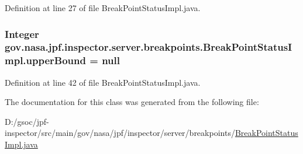 Definition at line 27 of file Break\+Point\+Status\+Impl.\+java.

\subsubsection[{\texorpdfstring{upper\+Bound}{upperBound}}]{\setlength{\rightskip}{0pt plus 5cm}Integer gov.\+nasa.\+jpf.\+inspector.\+server.\+breakpoints.\+Break\+Point\+Status\+Impl.\+upper\+Bound = null\hspace{0.3cm}{\ttfamily [private]}}\hypertarget{classgov_1_1nasa_1_1jpf_1_1inspector_1_1server_1_1breakpoints_1_1_break_point_status_impl_af41be5d132bc3dfc4e315cceadb116ea}{}\label{classgov_1_1nasa_1_1jpf_1_1inspector_1_1server_1_1breakpoints_1_1_break_point_status_impl_af41be5d132bc3dfc4e315cceadb116ea}


Definition at line 42 of file Break\+Point\+Status\+Impl.\+java.



The documentation for this class was generated from the following file\+:\begin{DoxyCompactItemize}
\item 
D\+:/gsoc/jpf-\/inspector/src/main/gov/nasa/jpf/inspector/server/breakpoints/\hyperlink{_break_point_status_impl_8java}{Break\+Point\+Status\+Impl.\+java}\end{DoxyCompactItemize}
